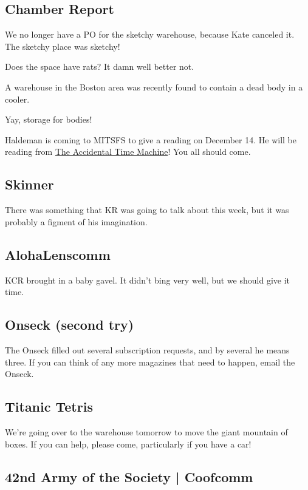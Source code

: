 \documentclass[10pt]{article}
\begin{document}
\subsection*{Chamber Report}

We no longer have a PO for the sketchy warehouse, because Kate canceled it.  The sketchy place was sketchy!

Does the space have rats?  It damn well better not.

A warehouse in the Boston area was recently found to contain a dead body in a cooler.

Yay, storage for bodies!

Haldeman is coming to MITSFS to give a reading on December 14.  He will be reading from \underline{The Accidental Time Machine}!  You all should come.

\subsection*{Skinner}

There was something that KR was going to talk about this week, but it was probably a figment of his imagination.

\subsection*{AlohaLenscomm}

KCR brought in a baby gavel.  It didn't bing very well, but we should give it time.

\subsection*{Onseck (second try)}

The Onseck filled out several subscription requests, and by several he means three.  If you can think of any more magazines that need to happen, email the Onseck.

\subsection*{Titanic Tetris}

We're going over to the warehouse tomorrow to move the giant mountain of boxes.  If you can help, please come, particularly if you have a car!

\subsection*{42nd Army of the Society | Coofcomm}
\end{document}
